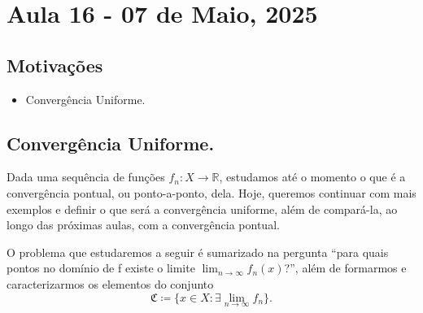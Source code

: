 \documentclass[../analysisII_notes.tex]{subfiles}
\begin{document}
\section{Aula 16 - 07 de Maio, 2025}
\subsection{Motivações}
\begin{itemize}
	\item Convergência Uniforme.
\end{itemize}
\subsection{Convergência Uniforme.}
Dada uma sequência de funções \(f_{n}:X\rightarrow \mathbb{R}\), estudamos até o momento o que é a convergência pontual, ou ponto-a-ponto, dela. Hoje, queremos continuar com mais exemplos e definir o que será a convergência uniforme, além de compará-la, ao longo das próximas aulas, com a convergência pontual.

O problema que estudaremos a seguir é sumarizado na pergunta ``para quais pontos no domínio de f existe o limite \(\lim_{n\to \infty}f_{n}(x)\)?'', além de formarmos e caracterizarmos os elementos do conjunto
\[
	\mathfrak{C}\coloneqq \{x\in X: \exists \lim_{n\to \infty}f_{n}\}.
\]
\end{document}
